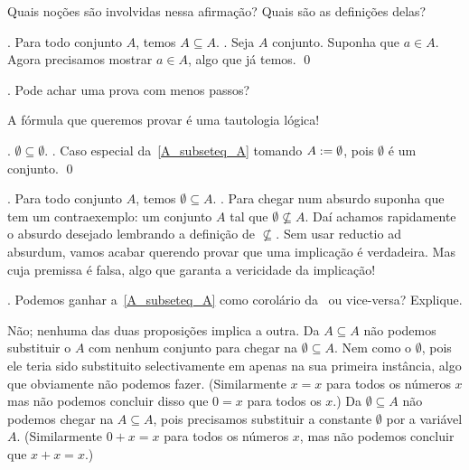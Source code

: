 \hint
Quais noções são involvidas nessa afirmação?
Quais são as definições delas?

\endexercise

\proposition.
\label{A_subseteq_A}%
Para todo conjunto $A$, temos $A \subseteq A$.
\proof.
Seja $A$ conjunto.  Suponha que $a \in A$.
Agora precisamos mostrar $a\in A$, algo que já temos.
\qed

\exercise.
Pode achar uma prova com menos passos?

\solution
A fórmula que queremos provar é uma tautologia lógica!

\endexercise

\corollary.
\label{emptyset_subseteq_emptyset}%
$\emptyset\subseteq\emptyset$.
\proof.
Caso especial da~\ref{A_subseteq_A} tomando $A\mathrel{:=} \emptyset$,
pois $\emptyset$ é um conjunto.
\qed

\proposition.
\label{emptyset_subseteq_A}%
Para todo conjunto $A$, temos $\emptyset \subseteq A$.
\sketch.
Para chegar num absurdo suponha que tem um contraexemplo: um conjunto $A$ tal que $\emptyset\nsubseteq A$.
Daí achamos rapidamente o absurdo desejado lembrando a definição de $\nsubseteq$.
Sem usar reductio ad absurdum, vamos acabar querendo provar que uma implicação é verdadeira.
Mas cuja premissa é falsa, algo que garanta a vericidade da implicação!
\qes

\exercise.
\label{emptyset_subseteq_A_does_not_imply_A_subseteq_A_and_vv}%
Podemos ganhar a~\ref{A_subseteq_A} como corolário da~
ou vice-versa?  Explique.

\solution
Não; nenhuma das duas proposições implica a outra.
Da $A\subseteq A$ não podemos substituir o $A$ com nenhum conjunto para chegar na $\emptyset\subseteq A$.
Nem como o $\emptyset$, pois ele teria sido substituito selectivamente em apenas na sua primeira instância, algo que obviamente não podemos fazer.
(Similarmente $x = x$ para todos os números $x$ mas não podemos concluir disso que $0 = x$ para todos os $x$.)
Da $\emptyset\subseteq A$ não podemos chegar na $A \subseteq A$, pois precisamos substituir a constante $\emptyset$ por a variável $A$.
(Similarmente $0 + x = x$ para todos os números $x$, mas não podemos concluir que $x + x = x$.)

\endexercise

